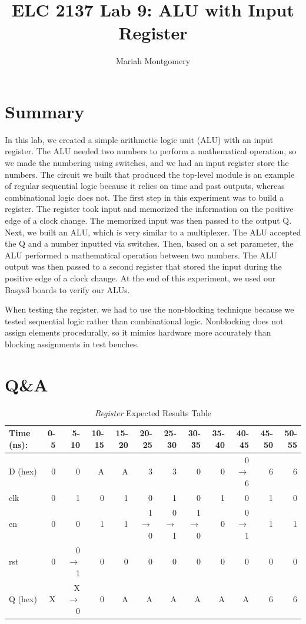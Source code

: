 \documentclass[11pt]{article}
\begin{document}
\title{ELC 2137 Lab 9: ALU with Input Register }
\author{Mariah Montgomery}

\maketitle


\section*{Summary}

In this lab, we created a simple arithmetic logic unit (ALU) with an input register. The ALU needed two numbers to perform a mathematical operation, so we made the numbering using switches, and we had an input register store the numbers. The circuit we built that produced the top-level module is an example of regular sequential logic because it relies on time and past outputs, whereas combinational logic does not. The first step in this experiment was to build a register. The register took input and memorized the information on the positive edge of a clock change. The memorized input was then passed to the output Q. Next, we built an ALU, which is very similar to a multiplexer. The ALU accepted the Q and a number inputted via switches. Then, based on a set parameter, the ALU performed a mathematical operation between two numbers. The ALU output was then passed to a second register that stored the input during the positive edge of a clock change. At the end of this experiment, we used our Basys3 boards to verify our ALUs.

When testing the register, we had to use the non-blocking technique because we tested sequential logic rather than combinational logic. Nonblocking does not assign elements procedurally, so it mimics hardware more accurately than blocking assignments in test benches. 



\section*{Q\&A}

\begin{table}[ht]\centering
	\caption{\textit{Register} Expected Results Table}
	\label{ALU:tbl:register_ERT}\medskip
	\begin{tabular}{l|rrrrrrrrrrr}
		Time (ns): & 0-5 & 5-10 & 10-15 & 15-20 & 20-25 & 25-30 & 30-35 & 35-40 & 40-45 & 45-50 & 50-55 \\
		\midrule
		D (hex) & 0 & 0 	  & A & A & 3 	    & 3 	  & 0 	    & 0 & 0$\to$6 & 6 & 6 \\
		clk     & 0 & 1 	  & 0 & 1 & 0 	    & 1 	  & 0 	    & 1 & 0 	  & 1 & 0 \\
		en  	& 0 & 0 	  & 1 & 1 & 1$\to$0 & 0$\to$1 & 1$\to$0 & 0 & 0$\to$1 & 1 & 1 \\
		rst 	& 0 & 0$\to$1 & 0 & 0 & 0 		& 0 	  & 0		& 0 & 0		  & 0 & 0 \\
		\midrule
		Q (hex) & X & X$\to$0 & 0 & A & A & A & A & A & A & 6 & 6 \\
		\bottomrule
	\end{tabular}
\end{table}
\end{document}
